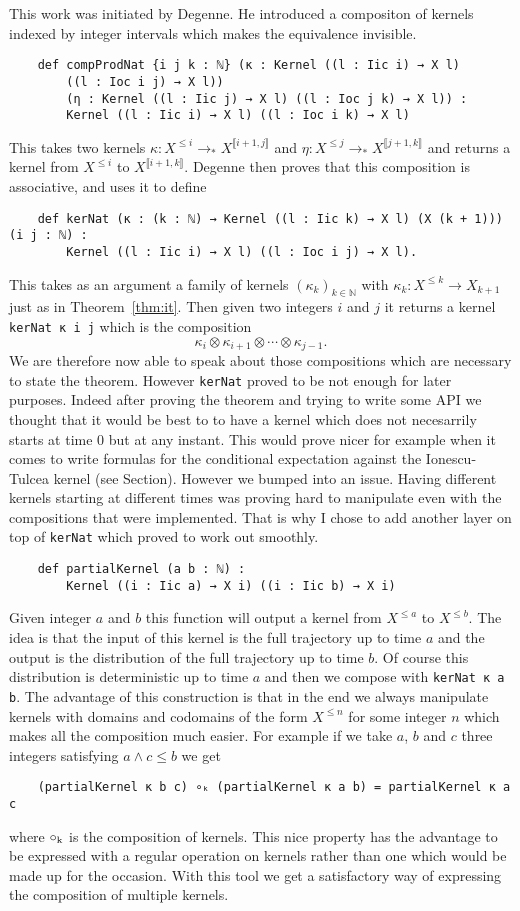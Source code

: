 \documentclass{article}
\newcommand{\lean}[1]{\lstinline[language=lean]{#1}}
\newcommand{\N}{\mathbb{N}}
\newcommand{\Xle}[1]{X^{\le#1}}
\newcommand{\Xlen}{X^{\le n}}
\newcommand{\dbrack}[1]{\llbracket #1 \rrbracket}
\newcommand{\ox}{\otimes}
\newcommand{\tost}{\to_*}
\theoremstyle{definition}
\theoremstyle{remark}
\begin{document}
	This work was initiated by Degenne. He introduced a compositon of kernels indexed by integer intervals which makes the equivalence invisible.
	\begin{lstlisting}
	def compProdNat {i j k : ℕ} (κ : Kernel ((l : Iic i) → X l)
		((l : Ioc i j) → X l))
		(η : Kernel ((l : Iic j) → X l) ((l : Ioc j k) → X l)) :
		Kernel ((l : Iic i) → X l) ((l : Ioc i k) → X l)
	\end{lstlisting}
	This takes two kernels $\kappa : \Xle{i} \tost X^{\dbrack{i+1,j}}$ and $\eta : \Xle{j} \tost X^{\dbrack{j+1,k}}$ and returns a kernel from $\Xle{i}$ to $X^{\dbrack{i+1,k}}$. Degenne then proves that this composition is associative, and uses it to define
	\begin{lstlisting}
	def kerNat (κ : (k : ℕ) → Kernel ((l : Iic k) → X l) (X (k + 1))) (i j : ℕ) :
		Kernel ((l : Iic i) → X l) ((l : Ioc i j) → X l).
	\end{lstlisting}
	This takes as an argument a family of kernels $(\kappa_k)_{k\in\N}$ with $\kappa_k : \Xle{k}\to X_{k+1}$ just as in Theorem~\ref{thm:it}. Then given two integers $i$ and $j$ it returns a kernel \lean{kerNat κ i j} which is the composition
	$$\kappa_i \ox \kappa_{i+1} \ox \cdots \ox \kappa_{j-1}.$$
	We are therefore now able to speak about those compositions which are necessary to state the theorem. However \lean{kerNat} proved to be not enough for later purposes. Indeed after proving the theorem and trying to write some API we thought that it would be best to to have a kernel which does not necesarrily starts at time 0 but at any instant. This  would prove nicer for example when it comes to write formulas for the conditional expectation against the Ionescu-Tulcea kernel (see Section). However we bumped into an issue. Having different kernels starting at different times was proving hard to manipulate even with the compositions that were implemented. That is why I chose to add another layer on top of \lean{kerNat} which proved to work out smoothly.
	\begin{lstlisting}
	def partialKernel (a b : ℕ) :
		Kernel ((i : Iic a) → X i) ((i : Iic b) → X i)
	\end{lstlisting}
	Given integer $a$ and $b$ this function will output a kernel from $\Xle{a}$ to $\Xle{b}$. The idea is that the input of this kernel is the full trajectory up to time $a$ and the output is the distribution of the full trajectory up to time $b$. Of course this distribution is deterministic up to time $a$ and then we compose with \lean{kerNat κ a b}. The advantage of this construction is that in the end we always manipulate kernels with domains and codomains of the form $\Xlen$ for some integer $n$ which makes all the composition much easier. For example if we take $a$, $b$ and $c$ three integers satisfying $a \land c \le b$ we get
	\begin{lstlisting}
	(partialKernel κ b c) ∘ₖ (partialKernel κ a b) = partialKernel κ a c
	\end{lstlisting}
	where $\circ_{\rm k}$ is the composition of kernels. This nice property has the advantage to be expressed with a regular operation on kernels rather than one which would be made up for the occasion. With this tool we get a satisfactory way of expressing the composition of multiple kernels.
\end{document}
